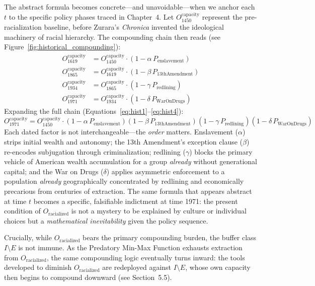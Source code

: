 \documentclass[12pt,openany]{book}
\begin{document}
The abstract formula becomes concrete---and unavoidable---when we anchor each $t$ to the specific policy phases traced in Chapter~4. Let $O_{1450}^{\text{capacity}}$ represent the pre-racialization baseline, before Zurara's \textit{Chronica} invented the ideological machinery of racial hierarchy. The compounding chain then reads (see Figure~\ref{fig:historical_compounding}):
\begin{align}
O_{1619}^{\text{capacity}} &= O_{1450}^{\text{capacity}} \cdot (1 - \alpha\, P_{\text{enslavement}}) \label{eq:hist1}\\[4pt]
O_{1865}^{\text{capacity}} &= O_{1619}^{\text{capacity}} \cdot (1 - \beta\, P_{\text{13thAmendment}}) \label{eq:hist2}\\[4pt]
O_{1934}^{\text{capacity}} &= O_{1865}^{\text{capacity}} \cdot (1 - \gamma\, P_{\text{redlining}}) \label{eq:hist3}\\[4pt]
O_{1971}^{\text{capacity}} &= O_{1934}^{\text{capacity}} \cdot (1 - \delta\, P_{\text{WarOnDrugs}}) \label{eq:hist4}
\end{align}
Expanding the full chain (Equations~\ref{eq:hist1}--\ref{eq:hist4}):
\[
O_{1971}^{\text{capacity}} = O_{1450}^{\text{capacity}} \cdot (1-\alpha\, P_{\text{enslavement}})(1-\beta\, P_{\text{13thAmendment}})(1-\gamma\, P_{\text{redlining}})(1-\delta\, P_{\text{WarOnDrugs}})
\]
Each dated factor is not interchangeable---the \textit{order} matters. Enslavement ($\alpha$) strips initial wealth and autonomy; the 13th Amendment's exception clause ($\beta$) re-encodes subjugation through criminalization; redlining ($\gamma$) blocks the primary vehicle of American wealth accumulation for a group \textit{already} without generational capital; and the War on Drugs ($\delta$) applies asymmetric enforcement to a population \textit{already} geographically concentrated by redlining and economically precarious from centuries of extraction. The same formula that appears abstract at time $t$ becomes a specific, falsifiable indictment at time 1971: the present condition of $O_{\text{racialized}}$ is not a mystery to be explained by culture or individual choices but a \textit{mathematical inevitability} given the policy sequence.

Crucially, while $O_{\text{racialized}}$ bears the primary compounding burden, the buffer class $I \setminus E$ is not immune. As the Predatory Min-Max Function exhausts extraction from $O_{\text{racialized}}$, the same compounding logic eventually turns inward: the tools developed to diminish $O_{\text{racialized}}$ are redeployed against $I \setminus E$, whose own capacity then begins to compound downward (see Section~5.5).
\end{document}
